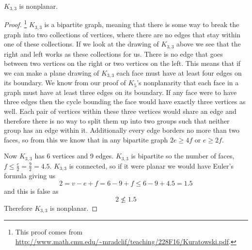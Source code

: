 \documentclass{article}
\begin{document}
\begin{theorem} \label{k3,3}
	$K_{3,3}$ is nonplanar.
\end{theorem}
\begin{center}
		
\end{center}
\begin{proof}\footnote{This proof comes from \url{http://www.math.cmu.edu/~mradclif/teaching/228F16/Kuratowski.pdf}.}
	$K_{3,3}$ is a bipartite graph, meaning that there is some way to break the graph into two collections of vertices, where there are no edges that stay within one of these collections. If we look at the drawing of $K_{3,3}$ above we see that the right and left works as these collections for us. There is no edge that goes between two vertices on the right or two vertices on the left. This means that if we can make a plane drawing of $K_{3,3}$ each face must have at least four edges on its boundary. We know from our proof of $K_5$'s nonplanarity that each face in a graph must have at least three edges on its boundary. If any face were to have three edges then the cycle bounding the face would have exactly three vertices as well. Each pair of vertices within these three vertices would share an edge and therefore there is no way to split them up into two groups such that neither group has an edge within it. Additionally every edge borders no more than two faces, so from this we know that in any bipartite graph $2e \ge 4f$ or $e\ge 2f$.
	
	Now $K_{3,3}$ has 6 vertices and 9 edges. $K_{3,3}$ is bipartite so the number of faces, $f \le \frac e2 = \frac92 = 4.5$. $K_{3,3}$ is connected, so if it were planar we would have Euler's formula giving us $$2=v-e+f=6-9+f\le6-9+4.5=1.5$$ and this is false as $$2\not\le1.5$$ Therefore $K_{3,3}$ is nonplanar.
\end{proof}
\end{document}
